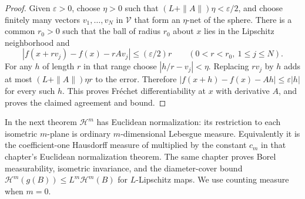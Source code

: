 \documentclass[11pt,oneside,openany]{book}
\theoremstyle{definition}
\theoremstyle{remark}
\begin{document}
\begin{proof}
Given \(\varepsilon>0\), choose \(\eta>0\) such that
\((L+\|A\|)\eta<\varepsilon/2\), and choose finitely many
vectors \(v_1,\ldots,v_N\) in \(\mathcal V\) that form an
\(\eta\)-net of the sphere. There is a common \(r_0>0\) such
that the ball of radius \(r_0\) about \(x\) lies in the Lipschitz
neighborhood and
\[
 |f(x+rv_j)-f(x)-rAv_j|\leq (\varepsilon/2)r
 \qquad(0<r<r_0,\ 1\leq j\leq N).
\]
For any \(h\) of length \(r\) in that range choose
\(|h/r-v_j|<\eta\). Replacing \(rv_j\) by \(h\) adds at most
\((L+\|A\|)\eta r\) to the error. Therefore
\(|f(x+h)-f(x)-Ah|\leq\varepsilon|h|\) for every such \(h\).
This proves Fr\'echet differentiability at \(x\) with derivative
\(A\), and proves the claimed agreement and bound.
\end{proof}

In the next theorem \(\mathcal H^m\) has Euclidean normalization:
its restriction to each isometric \(m\)-plane is ordinary
\(m\)-dimensional Lebesgue measure. Equivalently it is the
coefficient-one Hausdorff measure of \cite[Chapter~22]{d11}
multiplied by the constant \(c_m\) in that chapter's Euclidean
normalization theorem. The same chapter proves Borel
measurability, isometric invariance, and the diameter-cover bound
\(\mathcal H^m(g(B))\leq L^m\mathcal H^m(B)\) for \(L\)-Lipschitz
maps. We use counting measure when \(m=0\).
\end{document}
